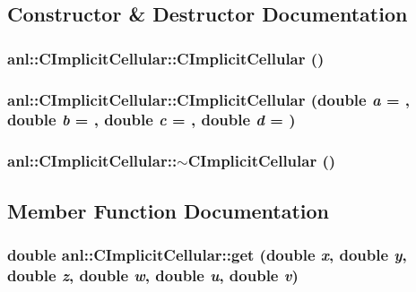\subsection{Constructor \& Destructor Documentation}
\hypertarget{classanl_1_1CImplicitCellular_a25da8b1ecdb5396f6e741bab08565b69}{
\subsubsection[{CImplicitCellular}]{\setlength{\rightskip}{0pt plus 5cm}anl::CImplicitCellular::CImplicitCellular ()}}
\label{classanl_1_1CImplicitCellular_a25da8b1ecdb5396f6e741bab08565b69}
\hypertarget{classanl_1_1CImplicitCellular_a1e754952ba8e132d394cfc2fa87dc048}{
\subsubsection[{CImplicitCellular}]{\setlength{\rightskip}{0pt plus 5cm}anl::CImplicitCellular::CImplicitCellular (double {\em a} = {}, \/  double {\em b} = {}, \/  double {\em c} = {}, \/  double {\em d} = {})}}
\label{classanl_1_1CImplicitCellular_a1e754952ba8e132d394cfc2fa87dc048}
\hypertarget{classanl_1_1CImplicitCellular_a59210b37300b9e5849e73ec834d21bc6}{
\subsubsection[{$\sim$CImplicitCellular}]{\setlength{\rightskip}{0pt plus 5cm}anl::CImplicitCellular::$\sim$CImplicitCellular ()}}
\label{classanl_1_1CImplicitCellular_a59210b37300b9e5849e73ec834d21bc6}


\subsection{Member Function Documentation}
\hypertarget{classanl_1_1CImplicitCellular_a0d5bebde497611f47083b97220ecffef}{
\subsubsection[{get}]{\setlength{\rightskip}{0pt plus 5cm}double anl::CImplicitCellular::get (double {\em x}, \/  double {\em y}, \/  double {\em z}, \/  double {\em w}, \/  double {\em u}, \/  double {\em v})}}
\label{classanl_1_1CImplicitCellular_a0d5bebde497611f47083b97220ecffef}



